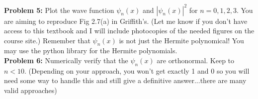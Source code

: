 \documentclass[12pt]{book}
\begin{document}
\noindent
{\bf Problem 5:} Plot the wave function $\psi_n(x)$ and
$|\psi_n(x)|^2$ for $n=0,1,2,3$.  You are aiming to reproduce Fig
2.7(a) in Griffith's.  (Let me know if you don't have access to this textbook
and I will include photocopies of the needed figures on the course
site.)  Remember that $\psi_n(x)$ is not just the Hermite polynomical!
You may use the python library for the Hermite polynomials.\\[5pt]

\noindent
{\bf Problem 6:} Numerically verify that the $\psi_n(x)$ are
orthonormal.  Keep to $n<10$.  (Depending on your approach, you won't
get exactly 1 and 0 so you will need some way to handle this and still
give a definitive answer...there are many valid approaches)\\[5pt]
\end{document}
